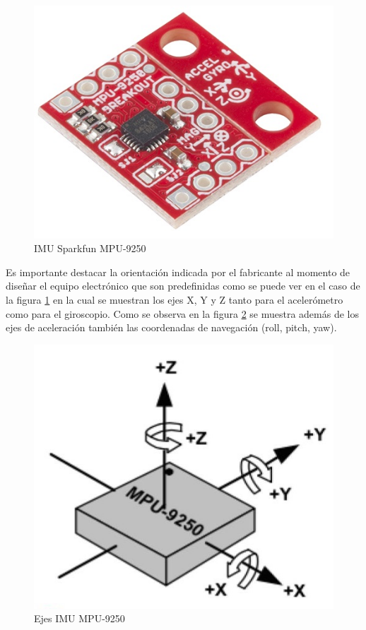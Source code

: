 \begin{figure}[H]
	\centering
	\includegraphics[scale=1.5]{figuras/sensor/imu/imu1.jpg}
	\caption{IMU Sparkfun MPU-9250}
	\label{imu1}
\end{figure}

Es importante destacar la orientación indicada por el fabricante al momento de diseñar el equipo electrónico que son predefinidas como se puede ver en el caso de la figura \ref{imu1} en la cual se muestran los ejes X, Y y Z tanto para el acelerómetro como para el giroscopio. 
\newpage
Como se observa en la figura \ref{imu11} se muestra además de los ejes de aceleración también las coordenadas de navegación (roll, pitch, yaw). 

\begin{figure}[H]
	\centering
	\includegraphics[scale=0.5]{figuras/sensor/imu/imu11.jpg}
	\caption{Ejes IMU MPU-9250}
	\label{imu11}
\end{figure}

